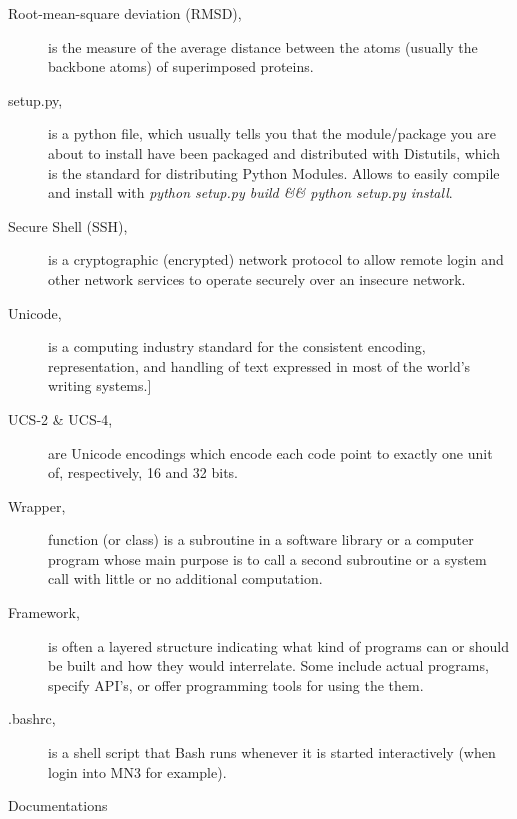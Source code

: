 \begin{description}
\item [Root-mean-square deviation (RMSD),] is the measure of the average distance between the atoms (usually the backbone atoms) of superimposed proteins.
\item [setup.py,] is a python file, which usually tells you that the module/package you are about to install have been packaged and distributed with Distutils, which is the standard for distributing Python Modules. Allows to easily compile and install with \textit{python setup.py build \&\& python setup.py install}.
\item [Secure Shell (SSH),]  is a cryptographic (encrypted) network protocol to allow remote login and other network services to operate securely over an insecure network. 
\item [Unicode,] is a computing industry standard for the consistent encoding, representation, and handling of text expressed in most of the world's writing systems.]
\item [UCS-2 \& UCS-4, ] are Unicode encodings which encode each code point to exactly one unit of, respectively, 16 and 32 bits. 
\item [Wrapper,]  function (or class) is a subroutine in a software library or a computer program whose main purpose is to call a second subroutine or a system call with little or no additional computation. 



\item[Framework,] is often a layered structure indicating what kind of programs can or should be built and how they would interrelate. Some include actual programs, specify API's, or offer programming tools for using the them.

\item [.bashrc,] is a shell script that Bash runs whenever it is started interactively (when login into MN3 for example).
\end{description}



Documentations

\label{sec:docs}

